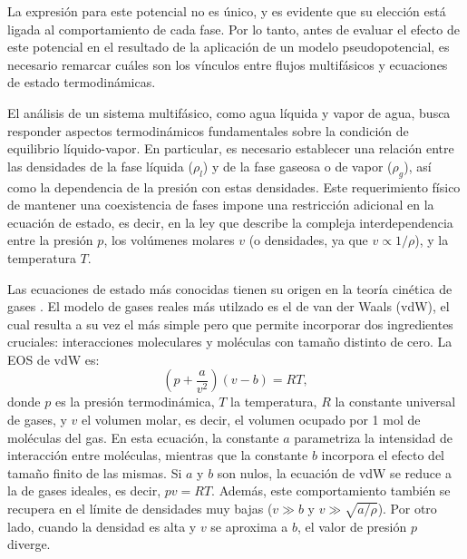 La expresi\'on para este potencial no es \'unico, y es evidente que su elecci\'on est\'a ligada al comportamiento de cada fase. Por lo tanto, antes de evaluar el efecto de este potencial en el resultado de la aplicaci\'on de un modelo pseudopotencial, es necesario remarcar cu\'ales son los v\'inculos entre flujos multif\'asicos y ecuaciones de estado termodin\'amicas.

El an\'alisis de un sistema multif\'asico, como agua l\'iquida y vapor de agua, busca responder aspectos termodin\'amicos fundamentales sobre la condici\'on de equilibrio l\'iquido-vapor. En particular, es necesario establecer una relaci\'on entre las densidades de la fase l\'iquida ($\rho_l$) y de la fase gaseosa o de vapor ($\rho_g$), as\'i como la dependencia de la presi\'on con estas densidades. Este requerimiento f\'isico de mantener una coexistencia de fases impone una restricci\'on adicional en la ecuaci\'on de estado, es decir, en la ley que describe la compleja interdependencia entre la presi\'on $p$, los vol\'umenes molares $v$ (o densidades, ya que $v \propto 1/\rho$), y la temperatura $T$. 

Las ecuaciones de estado m\'as conocidas tienen su origen en la teor\'ia cin\'etica de gases \cite{blundell_concepts_2006}. El modelo de gases reales m\'as utilzado es el de van der Waals (vdW), el cual resulta a su vez el m\'as simple pero que permite incorporar dos ingredientes cruciales: interacciones moleculares y mol\'eculas con tama\~no distinto de cero. La EOS de vdW es:
\begin{equation}
	\left( p + \dfrac{a}{v^2} \right) \left( v-b \right) = RT,
\end{equation}
donde $p$ es la presi\'on termodin\'amica, $T$ la temperatura, $R$ la constante universal de gases, y $v$ el volumen molar, es decir, el volumen ocupado por 1 mol de mol\'eculas del gas. En esta ecuaci\'on, la constante $a$ parametriza la intensidad de interacci\'on entre mol\'eculas, mientras que la constante $b$ incorpora el efecto del tama\~no finito de las mismas. Si $a$ y $b$ son nulos, la ecuaci\'on de vdW se reduce a la de gases ideales, es decir, $pv = RT$. Adem\'as, este comportamiento tambi\'en se recupera en el l\'imite de densidades muy bajas ($v \gg b$ y $v \gg \sqrt{a/\rho}$). Por otro lado, cuando la densidad es alta y $v$ se aproxima a $b$, el valor de presi\'on $p$ diverge.

